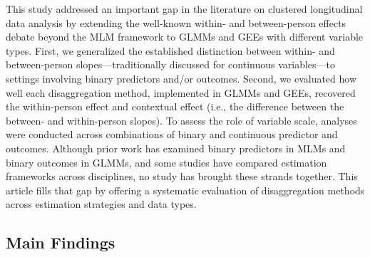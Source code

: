 \documentclass[stu]{apa7}
\begin{document}
This study addressed an important gap in the literature on clustered longitudinal data analysis by extending the well-known within- and between-person effects debate beyond the MLM framework to GLMMs and GEEs with different variable types. First, we generalized the established distinction between within- and between-person slopes—traditionally discussed for continuous variables—to settings involving binary predictors and/or outcomes. Second, we evaluated how well each disaggregation method, implemented in GLMMs and GEEs, recovered the within-person effect and contextual effect (i.e., the difference between the between- and within-person slopes). To assess the role of variable scale, analyses were conducted across combinations of binary and continuous predictor and outcomes. Although prior work has examined binary predictors in MLMs and binary outcomes in GLMMs, and some studies have compared estimation frameworks across disciplines, no study has brought these strands together. This article fills that gap by offering a systematic evaluation of disaggregation methods across estimation strategies and data types. 



\subsection{Main Findings}

\end{document}
